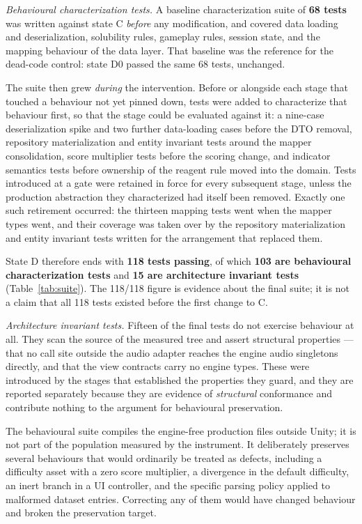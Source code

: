 \documentclass{sbc2019}%
\begin{document}
\emph{Behavioural characterization tests.} A baseline characterization suite of
\textbf{68 tests} was written against state C \emph{before} any modification, and
covered data loading and deserialization, solubility rules, gameplay rules,
session state, and the mapping behaviour of the data layer. That baseline was the
reference for the dead-code control: state D0 passed the same 68 tests, unchanged.

The suite then grew \emph{during} the intervention. Before or alongside each
stage that touched a behaviour not yet pinned down, tests were added to
characterize that behaviour first, so that the stage could be evaluated against
it: a nine-case deserialization spike and two further data-loading cases before
the DTO removal, repository materialization and entity invariant tests around the
mapper consolidation, score multiplier tests before the scoring change, and
indicator semantics tests before ownership of the reagent rule moved into the
domain. Tests introduced at a gate were retained in force for every subsequent
stage, unless the production abstraction they characterized had itself been
removed. Exactly one such retirement occurred: the thirteen mapping tests went
when the mapper types went, and their coverage was taken over by the repository
materialization and entity invariant tests written for the arrangement that
replaced them.

State D therefore ends with \textbf{118 tests passing}, of which \textbf{103 are
behavioural characterization tests} and \textbf{15 are architecture invariant
tests} (Table~\ref{tab:suite}). The 118/118 figure is evidence about the final
suite; it is not a claim that all 118 tests existed before the first change to C.

\emph{Architecture invariant tests.} Fifteen of the final tests do not exercise
behaviour at all. They scan the source of the measured tree and assert structural
properties --- that no call site outside the audio adapter reaches the engine
audio singletons directly, and that the view contracts carry no engine types.
These were introduced by the stages that established the properties they guard,
and they are reported separately because they are evidence of \emph{structural}
conformance and contribute nothing to the argument for behavioural preservation.

The behavioural suite compiles the engine-free production files outside Unity; it
is not part of the population measured by the instrument. It deliberately
preserves several behaviours that would ordinarily be treated as defects,
including a difficulty asset with a zero score multiplier, a divergence in the
default difficulty, an inert branch in a UI controller, and the specific parsing
policy applied to malformed dataset entries. Correcting any of them would have
changed behaviour and broken the preservation target.
\end{document}
